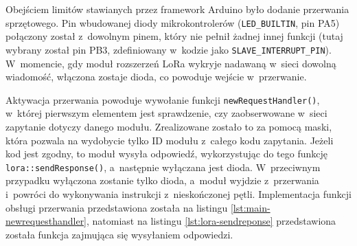 



\FloatBarrier
Obejściem limitów stawianych przez framework Arduino było dodanie przerwania sprzętowego. Pin wbudowanej
diody mikrokontrolerów (\texttt{LED\_BUILTIN}, pin PA5) połączony został z~dowolnym pinem, który nie pełnił żadnej innej
funkcji (tutaj wybrany został pin PB3, zdefiniowany w~kodzie jako \texttt{SLAVE\_INTERRUPT\_PIN}). W~momencie, gdy moduł
rozszerzeń LoRa wykryje nadawaną w~sieci dowolną wiadomość, włączona zostaje dioda, co powoduje wejście w~przerwanie.

Aktywacja przerwania powoduje wywołanie funkcji \texttt{newRequestHandler()}, w~której pierwszym elementem jest
sprawdzenie, czy zaobserwowane w~sieci zapytanie dotyczy danego modułu. Zrealizowane zostało to za pomocą maski, która
pozwala na wydobycie tylko ID modułu z~całego kodu zapytania. Jeżeli kod jest zgodny, to moduł wysyła odpowiedź,
wykorzystując do tego funkcję \texttt{lora::sendResponse()}, a~następnie wyłączana jest dioda. W~przeciwnym przypadku
wyłączona zostanie tylko dioda, a~moduł wyjdzie z~przerwania i~powróci do wykonywania instrukcji z~nieskończonej pętli.
Implementacja funkcji obsługi przerwania przedstawiona została na listingu \ref{lst:main-newrequesthandler}, natomiast
na listingu \ref{lst:lora-sendreponse} przedstawiona została funkcja zajmująca się wysyłaniem odpowiedzi.





